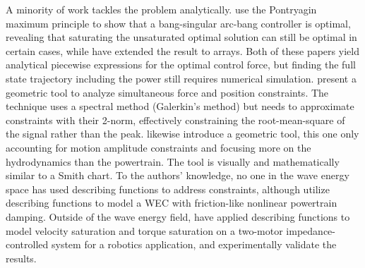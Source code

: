\documentclass{ifacconf}
\begin{document}
A minority of work tackles the problem analytically. \cite{zou_optimal_2017} use the Pontryagin maximum principle to show that a bang-singular arc-bang controller is optimal, revealing that saturating the unsaturated optimal solution can still be optimal in certain cases, while \cite{abdulkadir_optimal_2024} have  extended the result to arrays. Both of these papers yield analytical piecewise expressions for the optimal control force, but finding the full state trajectory including the power still requires numerical simulation. %
\cite{bacelli_geometric_2013} present a geometric tool to analyze simultaneous force and position constraints. The technique uses a spectral method (Galerkin's method) but needs to approximate constraints with their 2-norm, effectively constraining the root-mean-square of the signal rather than the peak. \cite{merigaud_geometrical_2023} likewise introduce a geometric tool, this one only accounting for motion amplitude constraints and focusing more on the hydrodynamics than the powertrain. The tool is visually and mathematically similar to a Smith chart. To the authors' knowledge, no one in the wave energy space has used describing functions to address constraints, although \cite{flower_describing-function_1980} utilize describing functions to model a WEC with friction-like nonlinear powertrain damping. Outside of the wave energy field, \cite{fukui_impedance_2021} have applied describing functions to model velocity saturation and torque saturation on a two-motor impedance-controlled system for a robotics application, and experimentally validate the results.


\end{document}
